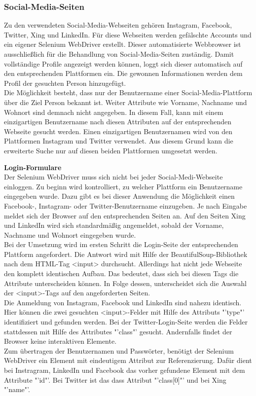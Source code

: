 			\subsubsection{Social-Media-Seiten}
			\label{subsubsec:SocialMediaSeiten}
			Zu den verwendeten Social-Media-Webseiten gehören Instagram, Facebook, Twitter, Xing und LinkedIn. Für diese Webseiten werden gefälschte Accounts und ein eigener Selenium WebDriver erstellt. Dieser automatisierte Webbrowser ist ausschließlich für die Behandlung von Social-Media-Seiten zuständig. Damit vollständige Profile angezeigt werden können, loggt sich dieser automatisch auf den entsprechenden Plattformen ein. Die gewonnen Informationen werden dem Profil der gesuchten Person hinzugefügt.\\
			Die Möglichkeit besteht, dass nur der Benutzername einer Social-Media-Plattform über die Ziel Person bekannt ist. Weiter Attribute wie Vorname, Nachname und Wohnort sind demnach nicht angegeben. In diesem Fall, kann mit einem einzigartigen Benutzername nach diesen Attributen auf der entsprechenden Webseite gesucht werden. Einen einzigartigen Benutzernamen wird von den Plattformen Instagram und Twitter verwendet. Aus diesem Grund kann die erweiterte Suche nur auf diesen beiden Plattformen umgesetzt werden.
			
			\textbf{Login-Formulare}\\
			Der Selenium WebDriver muss sich nicht bei jeder Social-Medi-Webseite einloggen. Zu beginn wird kontrolliert, zu welcher Plattform ein Benutzername eingegeben wurde. Dazu gibt es bei dieser Anwendung die Möglichkeit einen Facebook-, Instagram- oder Twitter-Benutzername einzugeben. Je nach Eingabe meldet sich der Browser auf den entsprechenden Seiten an. Auf den Seiten Xing und LinkedIn wird sich standardmäßig  angemeldet, sobald der Vorname, Nachname und Wohnort eingegeben wurde.\\
			Bei der Umsetzung wird im ersten Schritt die Login-Seite der entsprechenden Plattform angefordert. Die Antwort wird mit Hilfe der BeautifulSoup-Bibliothek nach dem HTML-Tag <input> durchsucht. Allerdings hat nicht jede Webseite den komplett identischen Aufbau. Das bedeutet, dass sich bei diesen Tags die Attribute unterscheiden können. In Folge dessen, unterscheidet sich die Auswahl der <input>-Tags auf den angeforderten Seiten.\\
			Die Anmeldung von Instagram, Facebook und LinkedIn sind nahezu identisch. Hier können die zwei gesuchten <input>-Felder mit Hilfe des Attributs "'type"' identifiziert und gefunden werden. Bei der Twitter-Login-Seite werden die Felder stattdessen mit Hilfe des Attributes "'class"' gesucht. Andernfalls findet der Browser keine interaktiven Elemente.\\
			Zum übertragen der Benutzernamen und Passwörter, benötigt der Selenium WebDriver ein Element mit eindeutigem Attribut zur Referenzierung. Dafür dient bei Instragram, LinkedIn und Facebook das vorher gefundene Element mit dem Attribute "'id"'. Bei Twitter ist das dass Attribut "'class[0]"' und bei Xing "'name"'.
			 
